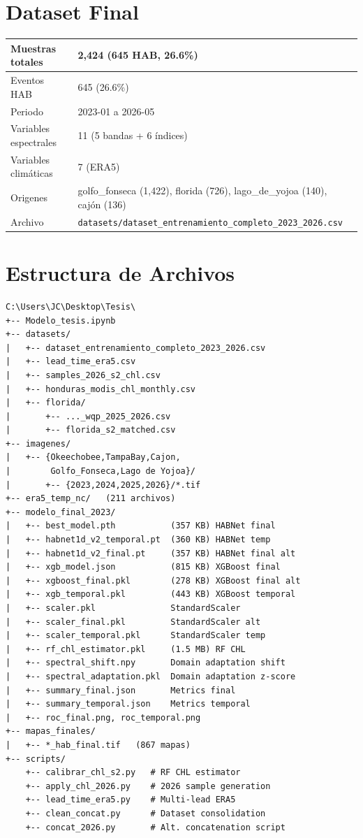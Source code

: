 \documentclass[12pt]{article}
\newlength{\descrwidth}
\begin{document}
\section{Dataset Final}

\begin{table}[H]
\centering
\sloppy
\begin{tabular}{P{\descrwidth} P{\dimexpr\textwidth-\tabcolsep\relax}}
\toprule
Muestras totales & 2,424 (645 HAB, 26.6\%) \\
\midrule
Eventos HAB & 645 (26.6\%) \\
\midrule
Periodo & 2023-01 a 2026-05 \\
\midrule
Variables espectrales & 11 (5 bandas + 6 \'indices) \\
\midrule
Variables clim\'aticas & 7 (ERA5) \\
\midrule
Origenes & golfo\_fonseca (1,422), florida (726), lago\_de\_yojoa (140), caj\'on (136) \\
\midrule
Archivo & \texttt{datasets/dataset\_entrenamiento\_completo\_2023\_2026.csv} \\
\bottomrule
\end{tabular}
\end{table}

\section{Estructura de Archivos}
{\scriptsize
\begin{lstlisting}
C:\Users\JC\Desktop\Tesis\
+-- Modelo_tesis.ipynb
+-- datasets/
|   +-- dataset_entrenamiento_completo_2023_2026.csv
|   +-- lead_time_era5.csv
|   +-- samples_2026_s2_chl.csv
|   +-- honduras_modis_chl_monthly.csv
|   +-- florida/
|       +-- ..._wqp_2025_2026.csv
|       +-- florida_s2_matched.csv
+-- imagenes/
|   +-- {Okeechobee,TampaBay,Cajon,
|        Golfo_Fonseca,Lago de Yojoa}/
|       +-- {2023,2024,2025,2026}/*.tif
+-- era5_temp_nc/   (211 archivos)
+-- modelo_final_2023/
|   +-- best_model.pth           (357 KB) HABNet final
|   +-- habnet1d_v2_temporal.pt  (360 KB) HABNet temp
|   +-- habnet1d_v2_final.pt     (357 KB) HABNet final alt
|   +-- xgb_model.json           (815 KB) XGBoost final
|   +-- xgboost_final.pkl        (278 KB) XGBoost final alt
|   +-- xgb_temporal.pkl         (443 KB) XGBoost temporal
|   +-- scaler.pkl               StandardScaler
|   +-- scaler_final.pkl         StandardScaler alt
|   +-- scaler_temporal.pkl      StandardScaler temp
|   +-- rf_chl_estimator.pkl     (1.5 MB) RF CHL
|   +-- spectral_shift.npy       Domain adaptation shift
|   +-- spectral_adaptation.pkl  Domain adaptation z-score
|   +-- summary_final.json       Metrics final
|   +-- summary_temporal.json    Metrics temporal
|   +-- roc_final.png, roc_temporal.png
+-- mapas_finales/
|   +-- *_hab_final.tif   (867 mapas)
+-- scripts/
    +-- calibrar_chl_s2.py   # RF CHL estimator
    +-- apply_chl_2026.py    # 2026 sample generation
    +-- lead_time_era5.py    # Multi-lead ERA5
    +-- clean_concat.py      # Dataset consolidation
    +-- concat_2026.py       # Alt. concatenation script
\end{lstlisting}
}
\end{document}
